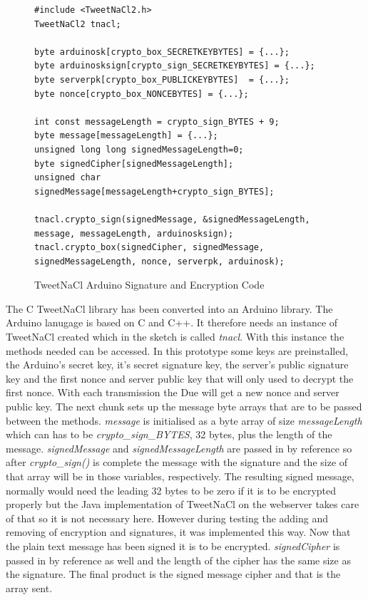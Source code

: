 \begin{figure}[H]
\begin{lstlisting}[style=Arduino]
#include <TweetNaCl2.h>
TweetNaCl2 tnacl;

byte arduinosk[crypto_box_SECRETKEYBYTES] = {...};
byte arduinosksign[crypto_sign_SECRETKEYBYTES] = {...};
byte serverpk[crypto_box_PUBLICKEYBYTES]  = {...};
byte nonce[crypto_box_NONCEBYTES] = {...};

int const messageLength = crypto_sign_BYTES + 9;
byte message[messageLength] = {...};
unsigned long long signedMessageLength=0;
byte signedCipher[signedMessageLength];
unsigned char signedMessage[messageLength+crypto_sign_BYTES];

tnacl.crypto_sign(signedMessage, &signedMessageLength, message, messageLength, arduinosksign);
tnacl.crypto_box(signedCipher, signedMessage, signedMessageLength, nonce, serverpk, arduinosk);
\end{lstlisting}
\caption{TweetNaCl Arduino Signature and Encryption Code}
\label{snip:nacl}
\end{figure}

The C TweetNaCl library has been converted into an Arduino library. The Arduino lanugage is based on C and C++. It therefore needs an instance of TweetNaCl created which in the sketch is called \emph{tnacl}. With this instance the methods needed can be accessed. In this prototype some keys are preinstalled, the Arduino's secret key, it's secret signature key, the server's public signature key and the first nonce and server public key that will only used to decrypt the first nonce. With each transmission the Due will get a new nonce and server public key. The next chunk sets up the message byte arrays that are to be passed between the methods. \emph{message} is initialised as a byte array of size \emph{messageLength} which can has to be \emph{crypto\_sign\_BYTES}, 32 bytes, plus the length of the message. \emph{signedMessage} and \emph{signedMessageLength} are passed in by reference so after \emph{crypto\_sign()} is complete the message with the signature and the size of that array will be in those variables, respectively. The resulting signed message, normally would need the leading 32 bytes to be zero if it is to be encrypted properly but the Java implementation of TweetNaCl on the webserver takes care of that so it is not necessary here. However during testing the adding and removing of encryption and signatures, it was implemented this way. Now that the plain text message has been signed it is to be encrypted. \emph{signedCipher} is passed in by reference as well and the length of the cipher has the same size as the signature. The final product is the signed message cipher and that is the array sent.

